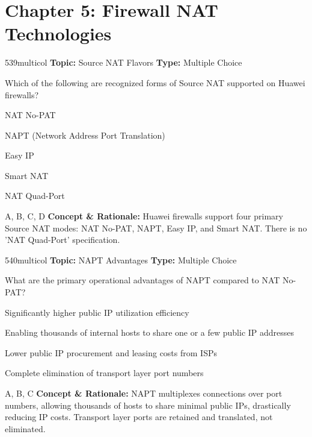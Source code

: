 \section{Chapter 5: Firewall NAT Technologies}

\begin{qcard}{539}{multicol}
\textcolor{darkslate!75}{\small\textbf{Topic:} Source NAT Flavors \hfill \textbf{Type:} Multiple Choice}\vspace{0.4em}\par
Which of the following are recognized forms of Source NAT supported on Huawei firewalls?
\begin{qoptions}
\item NAT No-PAT
\item NAPT (Network Address Port Translation)
\item Easy IP
\item Smart NAT
\item NAT Quad-Port
\end{qoptions}
\end{qcard}
\nopagebreak
\begin{explainbox}{A, B, C, D}
\textbf{Concept \& Rationale:} Huawei firewalls support four primary Source NAT modes: NAT No-PAT, NAPT, Easy IP, and Smart NAT. There is no 'NAT Quad-Port' specification.
\end{explainbox}

\begin{qcard}{540}{multicol}
\textcolor{darkslate!75}{\small\textbf{Topic:} NAPT Advantages \hfill \textbf{Type:} Multiple Choice}\vspace{0.4em}\par
What are the primary operational advantages of NAPT compared to NAT No-PAT?
\begin{qoptions}
\item Significantly higher public IP utilization efficiency
\item Enabling thousands of internal hosts to share one or a few public IP addresses
\item Lower public IP procurement and leasing costs from ISPs
\item Complete elimination of transport layer port numbers
\end{qoptions}
\end{qcard}
\nopagebreak
\begin{explainbox}{A, B, C}
\textbf{Concept \& Rationale:} NAPT multiplexes connections over port numbers, allowing thousands of hosts to share minimal public IPs, drastically reducing IP costs. Transport layer ports are retained and translated, not eliminated.
\end{explainbox}

